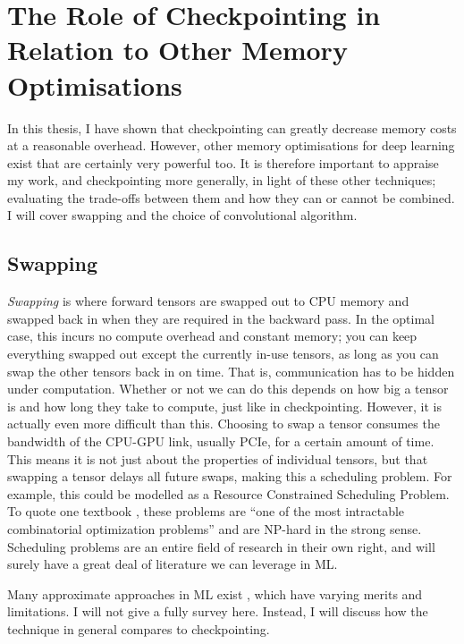 \section{The Role of Checkpointing in Relation to Other Memory Optimisations}
In this thesis, I have shown that checkpointing can greatly decrease memory costs at a reasonable overhead.
However, other memory optimisations for deep learning exist that are certainly very powerful too.
It is therefore important to appraise my work, and checkpointing more generally, in light of these other techniques; evaluating the trade-offs between them and how they can or cannot be combined.
I will cover swapping and the choice of convolutional algorithm.

\subsection{Swapping}
\textit{Swapping} is where forward tensors are swapped out to CPU memory and swapped back in when they are required in the backward pass.
In the optimal case, this incurs no compute overhead and constant memory; you can keep everything swapped out except the currently in-use tensors, as long as you can swap the other tensors back in on time.
That is, communication has to be hidden under computation.
Whether or not we can do this depends on how big a tensor is and how long they take to compute, just like in checkpointing.
However, it is actually even more difficult than this.
Choosing to swap a tensor consumes the bandwidth of the CPU-GPU link, usually PCIe, for a certain amount of time.
This means it is not just about the properties of individual tensors, but that swapping a tensor delays all future swaps, making this a scheduling problem.
For example, this could be modelled as a Resource Constrained Scheduling Problem.
To quote one textbook \cite[p.~23]{Artigues2007-rcps}, these problems are ``one of the most intractable combinatorial optimization problems'' and are NP-hard in the strong sense.
Scheduling problems are an entire field of research in their own right, and will surely have a great deal of literature we can leverage in ML.

Many approximate approaches in ML exist \cite{Zhang2019, Wang2018, Rhu2016, ShriramS2019, Li2019-mem-limited-devices, Le2018-tflms, Chen2019-modnn, Ito2017-ooc-cudnn, Aupy2016, Schanen2016, Kukreja2018, Aupy2019}, which have varying merits and limitations.
I will not give a fully survey here.
Instead, I will discuss how the technique in general compares to checkpointing.

